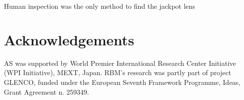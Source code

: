 \documentclass[useAMS,usenatbib]{mn2e}
\begin{document}
Human inspection was the only method to find the jackpot lens

\section*{Acknowledgements}

AS was supported by World Premier International Research Center Initiative (WPI Initiative), MEXT, Japan.
RBM's research was partly part of project GLENCO, funded under the European Seventh Framework Programme, Ideas, Grant Agreement n. 259349.






\appendix

\label{lastpage}
\end{document}
